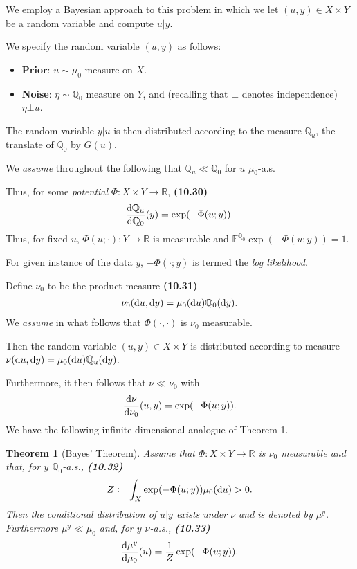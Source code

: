 \documentclass[oneside,11pt]{book}
\numberwithin{equation}{section}
\newtheorem{theorem}{Theorem}[section]
\begin{document}
We employ a Bayesian approach to this problem in which we let $(u,y)\in X\times Y$ be a random variable and compute $u|y$.

We specify the random variable $(u,y)$ as follows:
\begin{itemize}
    \item \textbf{Prior}: $u\sim\mu_0$ measure on $X$.
    \item \textbf{Noise}: $\eta\sim\mathbb{Q}_0$ measure on $Y$, and (recalling that $\bot$ denotes independence) $\eta\bot u$.
\end{itemize}
The random variable $y|u$ is then distributed according to the measure $\mathbb{Q}_u$, the translate of $\mathbb{Q}_0$ by $G(u)$.

We \textit{assume} throughout the following that $\mathbb{Q}_u\ll\mathbb{Q}_0$ for $u$ $\mu_0$-a.s.

Thus, for some \textit{potential} $\Phi:X\times Y\to\mathbb{R}$, \textbf{(10.30)}
\begin{align*}
    \frac{{\rm d}\mathbb{Q}_u}{{\rm d}\mathbb{Q}_0}(y) = \exp(-\Phi(u;y)).
\end{align*}
Thus, for fixed $u$, $\Phi(u;\cdot):Y\to\mathbb{R}$ is measurable and $\mathbb{E}^{\mathbb{Q}_0}\exp(-\Phi(u;y)) = 1$.

For given instance of the data $y$, $-\Phi(\cdot;y)$ is termed the \textit{log likelihood}.

%
Define $\nu_0$ to be the product measure \textbf{(10.31)}
\begin{align*}
    \nu_0({\rm d}u,{\rm d}y) = \mu_0({\rm d}u)\mathbb{Q}_0({\rm d}y).
\end{align*}
We \textit{assume} in what follows that $\Phi(\cdot,\cdot)$ is $\nu_0$ measurable.

Then the random variable $(u,y)\in X\times Y$ is distributed according to measure $\nu({\rm d}u,{\rm d}y) = \mu_0({\rm d}u)\mathbb{Q}_u({\rm d}y)$.

Furthermore, it then follows that $\nu\ll\nu_0$ with
\begin{align*}
    \frac{{\rm d}\nu}{{\rm d}\nu_0}(u,y) = \exp(-\Phi(u;y)).
\end{align*}
We have the following infinite-dimensional analogue of Theorem 1.

\begin{theorem}[Bayes' Theorem]
    Assume that $\Phi:X\times Y\to\mathbb{R}$ is $\nu_0$ measurable and that, for $y$ $\mathbb{Q}_0$-a.s., \textbf{(10.32)}
    \begin{align*}
        Z\coloneqq\int_X \exp(-\Phi(u;y))\mu_0({\rm d}u) > 0.
    \end{align*}
    Then the conditional distribution of $u|y$ exists under $\nu$ and is denoted by $\mu^y$. Furthermore $\mu^y\ll\mu_0$ and, for $y$ $\nu$-a.s., \textbf{(10.33)}
    \begin{align*}
        \frac{{\rm d}\mu^y}{{\rm d}\mu_0}(u) = \frac{1}{Z}\exp(-\Phi(u;y)).
    \end{align*}
\end{theorem}
\end{document}
